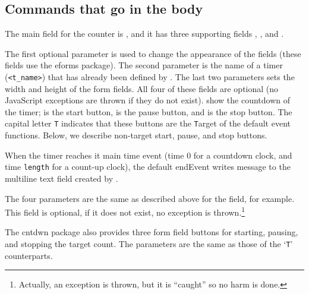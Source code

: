 \documentclass{article}
\begin{document}
\subsection{Commands that go in the body}

The main field for the counter is , and it has three
supporting fields , , and
.

\begin{dCmd*}{\linewidth}
\end{dCmd*}
\PD The first optional parameter is used to change the appearance of the
fields (these fields use the \textsf{eforms} package). The second
parameter is the name of a timer (\texttt{<t\_name>}) that has already been
defined by . The last two parameters sets the width and
height of the form fields.
\CmdDescription All four of these fields are optional (no JavaScript
exceptions are thrown if they do not exist).  show the
countdown of the timer;  is the start button,
 is the pause button, and  is the stop
button. The capital letter \texttt{T} indicates that these buttons are the
\texttt{T}arget of the default event functions. Below, we describe
non-target start, pause, and stop buttons.

When the timer reaches it main time event (time 0 for a
countdown clock, and time \texttt{length} for a count-up clock), the default
endEvent writes message to the multiline text field created by
.

\begin{dCmd*}{\linewidth}
\end{dCmd*}
\PD The four parameters are the same as described above for the
 field, for example. This field is optional, if it does
not exist, no exception is thrown.\footnote{Actually, an exception is
thrown, but it is ``caught'' so no harm is done.}

The \textsf{cntdwn} package also provides three form field buttons for
starting, pausing, and stopping the target count. The parameters are the
same as those of the `\texttt{T}' counterparts.
\begin{dCmd*}{\linewidth}
\end{dCmd*}
\end{document}
